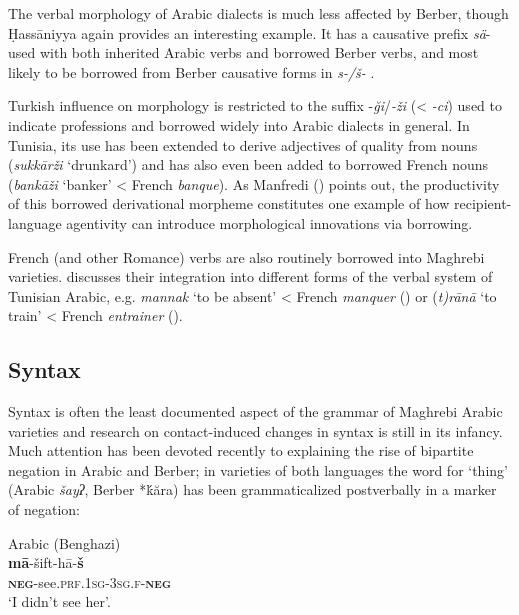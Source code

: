 \documentclass[output=paper]{langsci/langscibook}
\begin{document}
  The verbal morphology of Arabic dialects is much less affected by Berber, though Ḥassāniyya again provides an interesting example. It has a causative prefix \textit{sä}- used with both inherited Arabic verbs and borrowed Berber verbs, and most likely to be borrowed from Berber causative forms in \textit{s-/š-} \citep{Taine-Cheikh2008chapter}. 

  Turkish influence on morphology is restricted to the suffix -\textit{ği}/\textit{{}-ži} (< \textit{{}-ci}) used to indicate professions and borrowed widely into Arabic dialects in general. In Tunisia, its use has been extended to derive adjectives of quality from nouns (\textit{sukkārži} ‘drunkard’) and has also even been added to borrowed French nouns (\textit{bankāži} ‘banker’ < French \textit{banque}). As Manfredi (\citeyear[410]{Manfredi2018}) points out, the productivity of this borrowed derivational morpheme constitutes one example of how recipient-language agentivity can introduce morphological innovations via borrowing.

  French (and other Romance) verbs are also routinely borrowed into Maghrebi varieties. \citet{Talmoudi1986} discusses their integration into different forms of the verbal system of Tunisian Arabic, e.g. \textit{mannak} `to be absent' < French \textit{manquer} (\citeyear[81--82]{Talmoudi1986}) or (\textit{t)rānā} `to train' < French \textit{entrainer} (\citeyear[21--24]{Talmoudi1986}).

\subsection{ Syntax}

Syntax is often the least documented aspect of the grammar of Maghrebi Arabic varieties and research on contact-induced changes in syntax is still in its infancy. Much attention has been devoted recently to explaining the rise of bipartite negation in Arabic and Berber; in varieties of both languages the word for ‘thing’ (Arabic \textit{šayʔ}, Berber *ḱăra) has been grammaticalized postverbally in a marker of negation:


\ea\label{ex:key:}


Arabic (Benghazi)\\
\gll \textbf{mā}-šift-hā-\textbf{š}\\
     \textbf{\textsc{neg}}-see.\textsc{prf}.\textsc{1sg}-\textsc{3sg.f}-\textbf{\textsc{neg}}\\
\glt `I didn’t see her'.
\z

\ea\label{ex:key:}
\end{document}
